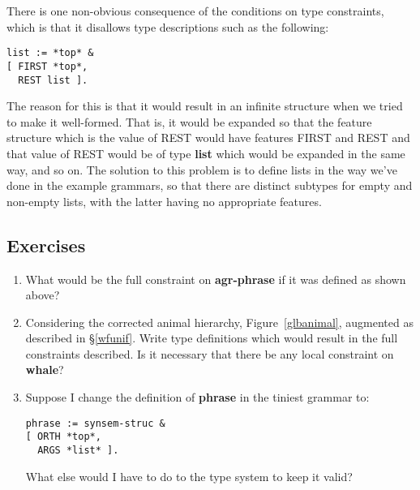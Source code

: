 \documentclass[12pt]{report}
\begin{document}
There is one non-obvious consequence of the conditions on
type constraints, which is that it disallows type
descriptions such as the following:
\begin{verbatim}
list := *top* &
[ FIRST *top*,
  REST list ].
\end{verbatim}
The reason for this is that it would result in an infinite structure
when we tried to make it well-formed.  That is, it would be expanded so
that the feature structure which is the value of REST would have
features FIRST and REST and that value of REST would be
of type {\bf list} which would be expanded in the same way, and so on.
The solution to this problem is to define lists in the way
we've done in the example grammars, so that there are distinct
subtypes for empty and non-empty lists, with the latter having
no appropriate features.

\subsection{Exercises}
\begin{enumerate}
\item What would be the full constraint on {\bf agr-phrase}
if it was defined as shown above?
\item Considering the corrected animal hierarchy, Figure~\ref{glbanimal},
augmented as described in \S\ref{wfunif}.  Write type
definitions which would result in the full constraints
described.  Is it necessary that there be any local constraint on
{\bf whale}?
\item Suppose I change the definition of {\bf phrase} in the
tiniest grammar to:
\begin{verbatim}
phrase := synsem-struc &
[ ORTH *top*,
  ARGS *list* ].
\end{verbatim}
What else would I have to do to the type system
to keep it valid?
\end{enumerate}
\end{document}
